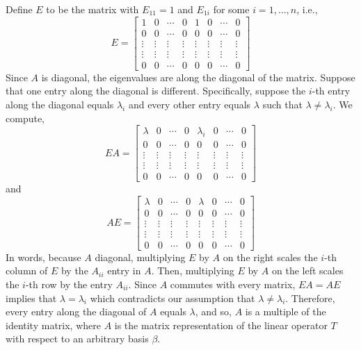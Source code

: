 \documentclass{article}
\begin{document}
Define $E$ to be the matrix with $E_{11} = 1$ and $E_{1i}$ for some $i = 1,\dots, n$, i.e., 
	\[ E = \begin{bmatrix} 1 & 0 & \cdots & 0 & 1 & 0 & \cdots & 0\\
			0 & 0 & \cdots & 0 & 0 & 0 & \cdots & 0\\
			\vdots & \vdots & \vdots & \vdots& \vdots& \vdots & \vdots & \vdots \\
			\vdots & \vdots & \vdots & \vdots& \vdots& \vdots & \vdots & \vdots \\
			0 & 0 & \cdots & 0 & 0 & 0 & \cdots & 0
			\end{bmatrix}\]
Since $A$ is diagonal, the eigenvalues are along the diagonal of the matrix. Suppose that one entry along the diagonal is different. Specifically, suppose the $i$-th entry along the diagonal equals $\lambda_i$ and every other entry equals $\lambda$ such that $\lambda\neq \lambda_i$. We compute,
	\[ EA = \begin{bmatrix} \lambda & 0 & \cdots & 0 & \lambda_i & 0 & \cdots & 0\\
			0 & 0 & \cdots & 0 & 0 & 0 & \cdots & 0\\
			\vdots & \vdots & \vdots & \vdots& \vdots& \vdots & \vdots & \vdots \\
			\vdots & \vdots & \vdots & \vdots& \vdots& \vdots & \vdots & \vdots \\
			0 & 0 & \cdots & 0 & 0 & 0 & \cdots & 0
			\end{bmatrix}\]
and 
	\[ AE = \begin{bmatrix} \lambda & 0 & \cdots & 0 & \lambda & 0 & \cdots & 0\\
			0 & 0 & \cdots & 0 & 0 & 0 & \cdots & 0\\
			\vdots & \vdots & \vdots & \vdots& \vdots& \vdots & \vdots & \vdots \\
			\vdots & \vdots & \vdots & \vdots& \vdots& \vdots & \vdots & \vdots \\
			0 & 0 & \cdots & 0 & 0 & 0 & \cdots & 0
			\end{bmatrix}\]
In words, because $A$ diagonal, multiplying $E$ by $A$ on the right scales the $i$-th column of $E$ by the $A_{ii}$ entry in $A$. Then, multiplying $E$ by $A$ on the left scales the $i$-th row by the entry $A_{ii}$. Since $A$ commutes with every matrix, $EA=AE$ implies that $\lambda = \lambda_i$ which contradicts our assumption that $\lambda\neq \lambda_i$. Therefore, every entry along the diagonal of $A$ equals $\lambda$, and so, $A$ is a multiple of the identity matrix, where $A$ is the matrix representation of the linear operator $T$ with respect to an arbitrary basis $\beta$. \\
\end{document}
